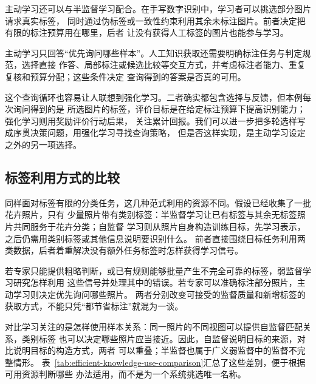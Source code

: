 主动学习还可以与半监督学习配合。在手写数字识别中，学习者可以挑选部分图片请求真实标签，
同时通过伪标签或一致性约束利用其余未标注图片。前者决定把有限的标注预算用在哪里，后者
让没有获得人工标签的图片也能参与学习。

主动学习只回答“优先询问哪些样本”。人工知识获取还需要明确标注任务与判定规范，选择直接
作答、局部标注或候选比较等交互方式，并考虑标注者能力、重复复核和预算分配；这些条件决定
查询得到的答案是否真的可用。

这个查询循环也容易让人联想到强化学习。二者确实都包含选择与反馈，但本例每次询问得到的是
所选图片的标签，评价目标是在给定标注预算下提高识别能力；强化学习则用奖励评价行动后果，
关注累计回报。我们可以进一步把多轮选样写成序贯决策问题，用强化学习寻找查询策略，
但是否这样实现，是主动学习设定之外的另一项选择。

\subsection{标签利用方式的比较}
\label{sec:efficient-knowledge-use-comparison}

同样面对标签有限的分类任务，这几种范式利用的资源不同。假设已经收集了一批花卉照片，只有
少量照片带有类别标签：半监督学习让已有标签与其余无标签照片共同服务于花卉分类；自监督
学习则从照片自身构造训练目标，先学习表示，之后仍需用类别标签或其他信息说明要识别什么。
前者直接围绕目标任务利用两类数据，后者着重解决没有额外任务标签时怎样获得学习信号。

若专家只能提供粗略判断，或已有规则能够批量产生不完全可靠的标签，弱监督学习研究怎样利用
这些信号并处理其中的错误。若专家可以准确标注部分照片，主动学习则决定优先询问哪些照片。
两者分别改变可接受的监督质量和新增标签的获取方式，不能只凭“都节省标注”就混为一谈。

对比学习关注的是怎样使用样本关系：同一照片的不同视图可以提供自监督匹配关系，类别标签
也可以决定哪些照片应当接近。因此，自监督说明目标的来源，对比说明目标的构造方式，两者
可以重叠；半监督也属于广义弱监督中的监督不完整情形。
表~\ref{tab:efficient-knowledge-use-comparison}汇总了这些差别，便于根据可用资源判断哪些
办法适用，而不是为一个系统挑选唯一名称。


